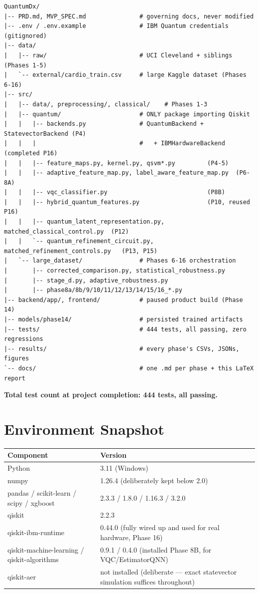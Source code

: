 \documentclass[11pt,a4paper]{article}
\begin{document}
\begin{lstlisting}
QuantumDx/
|-- PRD.md, MVP_SPEC.md               # governing docs, never modified
|-- .env / .env.example               # IBM Quantum credentials (gitignored)
|-- data/
|   |-- raw/                          # UCI Cleveland + siblings (Phases 1-5)
|   `-- external/cardio_train.csv     # large Kaggle dataset (Phases 6-16)
|-- src/
|   |-- data/, preprocessing/, classical/    # Phases 1-3
|   |-- quantum/                      # ONLY package importing Qiskit
|   |   |-- backends.py               # QuantumBackend + StatevectorBackend (P4)
|   |   |                             #   + IBMHardwareBackend (completed P16)
|   |   |-- feature_maps.py, kernel.py, qsvm*.py         (P4-5)
|   |   |-- adaptive_feature_map.py, label_aware_feature_map.py  (P6-8A)
|   |   |-- vqc_classifier.py                            (P8B)
|   |   |-- hybrid_quantum_features.py                   (P10, reused P16)
|   |   |-- quantum_latent_representation.py, matched_classical_control.py  (P12)
|   |   `-- quantum_refinement_circuit.py, matched_refinement_controls.py   (P13, P15)
|   `-- large_dataset/                # Phases 6-16 orchestration
|       |-- corrected_comparison.py, statistical_robustness.py
|       |-- stage_d.py, adaptive_robustness.py
|       |-- phase8a/8b/9/10/11/12/13/14/15/16_*.py
|-- backend/app/, frontend/           # paused product build (Phase 14)
|-- models/phase14/                   # persisted trained artifacts
|-- tests/                            # 444 tests, all passing, zero regressions
|-- results/                          # every phase's CSVs, JSONs, figures
`-- docs/                             # one .md per phase + this LaTeX report
\end{lstlisting}

\textbf{Total test count at project completion: 444 tests, all passing.}

\section{Environment Snapshot}

\begin{tabularx}{\textwidth}{@{}p{4.4cm}Y@{}}
\toprule
\textbf{Component} & \textbf{Version} \\
\midrule
Python & 3.11 (Windows) \\
numpy & 1.26.4 (deliberately kept below 2.0) \\
pandas / scikit-learn / scipy / xgboost & 2.3.3 / 1.8.0 / 1.16.3 / 3.2.0 \\
qiskit & 2.2.3 \\
qiskit-ibm-runtime & 0.44.0 (fully wired up and used for real hardware, Phase 16) \\
qiskit-machine-learning / qiskit-algorithms & 0.9.1 / 0.4.0 (installed Phase 8B, for VQC/EstimatorQNN) \\
qiskit-aer & not installed (deliberate --- exact statevector simulation suffices throughout) \\
\bottomrule
\end{tabularx}
\end{document}
